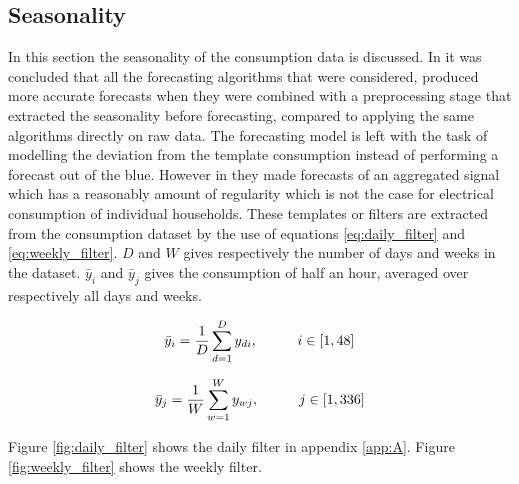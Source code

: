  


\subsection{Seasonality}
In this section the seasonality of the consumption data is discussed. In \cite{Hoverstad2015}it was concluded that all the forecasting algorithms that were considered, produced more accurate forecasts when they were combined with a preprocessing stage that extracted the seasonality before forecasting, compared to applying the same algorithms directly on raw data. The forecasting model is left with the task of modelling the deviation from the template consumption instead of performing a forecast out of the blue. However in \cite{Hoverstad2015} they made forecasts of an aggregated signal which has a reasonably amount of regularity which is not the case for electrical consumption of individual households. These templates or filters are extracted from the consumption dataset by the use of equations \ref{eq:daily_filter} and \ref{eq:weekly_filter}. $ D $ and $ W $ gives respectively the number of days and weeks in the dataset. $\bar{y}_i$ and $\bar{y}_j$ gives the consumption of half an hour, averaged over respectively all days and weeks. 

\begin{equation}\label{eq:daily_filter}
	\bar{y}_i = \frac{1}{D} \sum_{d=1}^D y_{di}, \hspace{10mm} i \in [1,48]
\end{equation} 

\begin{equation}\label{eq:weekly_filter}
	\bar{y}_j = \frac{1}{W} \sum_{w=1}^W y_{wj}, \hspace{10mm}  j \in [1,336]
\end{equation} 



Figure \ref{fig:daily_filter} shows the daily filter in appendix \ref{app:A}. Figure \ref{fig:weekly_filter} shows the weekly filter.

